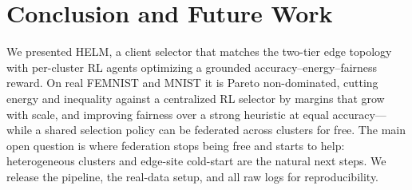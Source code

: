 \documentclass[conference]{IEEEtran}
\begin{document}
\section{Conclusion and Future Work}
We presented HELM, a client selector that matches the two-tier edge topology with
per-cluster RL agents optimizing a grounded accuracy--energy--fairness reward. On
real FEMNIST and MNIST it is Pareto non-dominated, cutting energy and inequality
against a centralized RL selector by margins that grow with scale, and improving
fairness over a strong heuristic at equal accuracy---while a shared selection
policy can be federated across clusters for free. The main open question is where
federation stops being free and starts to help: heterogeneous clusters and
edge-site cold-start are the natural next steps. We release the pipeline, the
real-data setup, and all raw logs for reproducibility.
\end{document}
